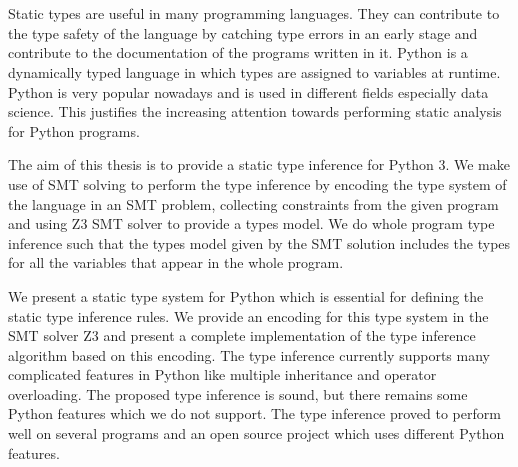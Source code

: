 \chapter{\abstractname}

Static types are useful in many programming languages. They can contribute to the type safety of the language by catching type errors in an early stage and contribute to the documentation of the programs written in it. Python is a dynamically typed language in which types are assigned to variables at runtime. Python is very popular nowadays and is used in different fields especially data science. This justifies the increasing attention towards performing static analysis for Python programs.

The aim of this thesis is to provide a static type inference for Python 3. We make use of SMT solving to perform the type inference by encoding the type system of the language in an SMT problem, collecting constraints from the given program and using Z3 SMT solver to provide a types model. We do whole program type inference such that the types model given by the SMT solution includes the types for all the variables that appear in the whole program.

We present a static type system for Python which is essential for defining the static type inference rules. We provide an encoding for this type system in the SMT solver Z3 and present a complete implementation of the type inference algorithm based on this encoding. The type inference currently supports many complicated features in Python like multiple inheritance and operator overloading. The proposed type inference is sound, but there remains some Python features which we do not support. The type inference proved to perform well on several programs and an open source project which uses different Python features.